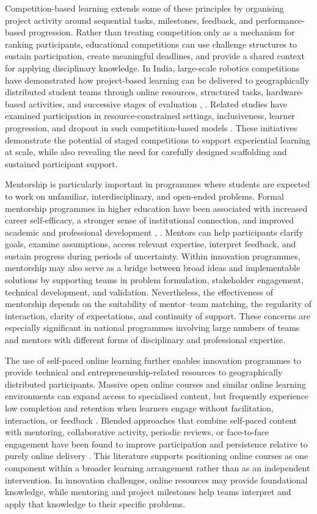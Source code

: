 \documentclass[runningheads]{llncs}
\begin{document}
Competition-based learning extends some of these principles by organising project activity around sequential tasks, milestones, feedback, and performance-based progression. Rather than treating competition only as a mechanism for ranking participants, educational competitions can use challenge structures to sustain participation, create meaningful deadlines, and provide a shared context for applying disciplinary knowledge. In India, large-scale robotics competitions have demonstrated how project-based learning can be delivered to geographically distributed student teams through online resources, structured tasks, hardware-based activities, and successive stages of evaluation \cite{b30}, \cite{b31}. Related studies have examined participation in resource-constrained settings, inclusiveness, learner progression, and dropout in such competition-based models \cite{b32,b33,b34}. These initiatives demonstrate the potential of staged competitions to support experiential learning at scale, while also revealing the need for carefully designed scaffolding and sustained participant support.

Mentorship is particularly important in programmes where students are expected to work on unfamiliar, interdisciplinary, and open-ended problems. Formal mentorship programmes in higher education have been associated with increased career self-efficacy, a stronger sense of institutional connection, and improved academic and professional development \cite{b22}, \cite{b23}. Mentors can help participants clarify goals, examine assumptions, access relevant expertise, interpret feedback, and sustain progress during periods of uncertainty. Within innovation programmes, mentorship may also serve as a bridge between broad ideas and implementable solutions by supporting teams in problem formulation, stakeholder engagement, technical development, and validation. Nevertheless, the effectiveness of mentorship depends on the suitability of mentor–team matching, the regularity of interaction, clarity of expectations, and continuity of support. These concerns are especially significant in national programmes involving large numbers of teams and mentors with different forms of disciplinary and professional expertise.

The use of self-paced online learning further enables innovation programmes to provide technical and entrepreneurship-related resources to geographically distributed participants. Massive open online courses and similar online learning environments can expand access to specialised content, but frequently experience low completion and retention when learners engage without facilitation, interaction, or feedback \cite{b24}. Blended approaches that combine self-paced content with mentoring, collaborative activity, periodic reviews, or face-to-face engagement have been found to improve participation and persistence relative to purely online delivery \cite{b25}. This literature supports positioning online courses as one component within a broader learning arrangement rather than as an independent intervention. In innovation challenges, online resources may provide foundational knowledge, while mentoring and project milestones help teams interpret and apply that knowledge to their specific problems.
\end{document}
